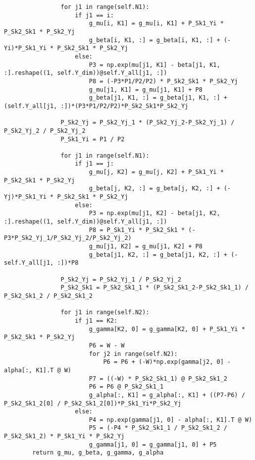 \begin{lstlisting}
                for j1 in range(self.N1):
                    if j1 == i:
                        g_mu[i, K1] = g_mu[i, K1] + P_Sk1_Yi * P_Sk2_Sk1 * P_Sk2_Yj
                        g_beta[i, K1, :] = g_beta[i, K1, :] + (-Yi)*P_Sk1_Yi * P_Sk2_Sk1 * P_Sk2_Yj
                    else:
                        P3 = np.exp(mu[j1, K1] - beta[j1, K1, :].reshape((1, self.Y_dim))@self.Y_all[j1, :])
                        P8 = (-P3*P1/P2/P2) * P_Sk2_Sk1 * P_Sk2_Yj
                        g_mu[j1, K1] = g_mu[j1, K1] + P8
                        g_beta[j1, K1, :] = g_beta[j1, K1, :] + (self.Y_all[j1, :])*(P3*P1/P2/P2)*P_Sk2_Sk1*P_Sk2_Yj

                P_Sk2_Yj = P_Sk2_Yj_1 * (P_Sk2_Yj_2-P_Sk2_Yj_1) / P_Sk2_Yj_2 / P_Sk2_Yj_2
                P_Sk1_Yi = P1 / P2

                for j1 in range(self.N1):
                    if j1 == j:
                        g_mu[j, K2] = g_mu[j, K2] + P_Sk1_Yi * P_Sk2_Sk1 * P_Sk2_Yj
                        g_beta[j, K2, :] = g_beta[j, K2, :] + (-Yj)*P_Sk1_Yi * P_Sk2_Sk1 * P_Sk2_Yj
                    else:
                        P3 = np.exp(mu[j1, K2] - beta[j1, K2, :].reshape((1, self.Y_dim))@self.Y_all[j1, :])
                        P8 = P_Sk1_Yi * P_Sk2_Sk1 * (-P3*P_Sk2_Yj_1/P_Sk2_Yj_2/P_Sk2_Yj_2)
                        g_mu[j1, K2] = g_mu[j1, K2] + P8
                        g_beta[j1, K2, :] = g_beta[j1, K2, :] + (-self.Y_all[j1, :])*P8

                P_Sk2_Yj = P_Sk2_Yj_1 / P_Sk2_Yj_2
                P_Sk2_Sk1 = P_Sk2_Sk1_1 * (P_Sk2_Sk1_2-P_Sk2_Sk1_1) / P_Sk2_Sk1_2 / P_Sk2_Sk1_2

                for j1 in range(self.N2):
                    if j1 == K2:
                        g_gamma[K2, 0] = g_gamma[K2, 0] + P_Sk1_Yi * P_Sk2_Sk1 * P_Sk2_Yj
                        P6 = W - W
                        for j2 in range(self.N2):
                            P6 = P6 + (-W)*np.exp(gamma[j2, 0] - alpha[:, K1].T @ W)
                        P7 = ((-W) * P_Sk2_Sk1_1) @ P_Sk2_Sk1_2
                        P6 = P6 @ P_Sk2_Sk1_1
                        g_alpha[:, K1] = g_alpha[:, K1] + ((P7-P6) / P_Sk2_Sk1_2[0] / P_Sk2_Sk1_2[0])*P_Sk1_Yi*P_Sk2_Yj
                    else:
                        P4 = np.exp(gamma[j1, 0] - alpha[:, K1].T @ W)
                        P5 = (-P4 * P_Sk2_Sk1_1 / P_Sk2_Sk1_2 / P_Sk2_Sk1_2) * P_Sk1_Yi * P_Sk2_Yj
                        g_gamma[j1, 0] = g_gamma[j1, 0] + P5
        return g_mu, g_beta, g_gamma, g_alpha


\end{lstlisting}

